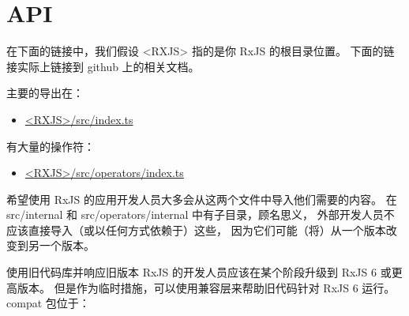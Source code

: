 \section{API}


在下面的链接中，我们假设 <RXJS> 指的是你 RxJS 的根目录位置。
下面的链接实际上链接到 github 上的相关文档。


主要的导出在：

\begin{itemize}
  \item \href{https://github.com/ReactiveX/rxjs/blob/master/src/index.ts}
        {<RXJS>/src/index.ts}
\end{itemize}


有大量的操作符：

\begin{itemize}
  \item \href{https://github.com/ReactiveX/rxjs/blob/master/src/operators/index.ts}
        {<RXJS>/src/operators/index.ts}
\end{itemize}


希望使用 RxJS 的应用开发人员大多会从这两个文件中导入他们需要的内容。
在 src/internal 和 src/operators/internal 中有子目录，顾名思义，
外部开发人员不应该直接导入（或以任何方式依赖于）这些，
因为它们可能（将）从一个版本改变到另一个版本。


使用旧代码库并响应旧版本 RxJS 的开发人员应该在某个阶段升级到 RxJS 6 或更高版本。
但是作为临时措施，可以使用兼容层来帮助旧代码针对 RxJS 6 运行。
compat 包位于：

